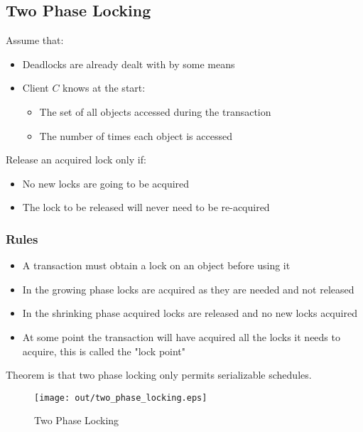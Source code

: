 \documentclass[a4paper]{article}
\begin{document}
\subsection{Two Phase Locking}

Assume that:

\begin{itemize}
  \item Deadlocks are already dealt with by some means
  \item Client $C$ knows at the start:
    \begin{itemize}
      \item The set of all objects accessed during the transaction
      \item The number of times each object is accessed
    \end{itemize}
\end{itemize}

Release an acquired lock only if:

\begin{itemize}
  \item No new locks are going to be acquired
  \item The lock to be released will never need to be re-acquired
\end{itemize}

\subsubsection{Rules}

\begin{itemize}
  \item A transaction must obtain a lock on an object before using it
  \item In the growing phase locks are acquired as they are needed and not
        released
  \item In the shrinking phase acquired locks are released and no new locks
        acquired
  \item At some point the transaction will have acquired all the locks it needs
        to acquire, this is called the "lock point"
\end{itemize}

Theorem is that two phase locking only permits serializable schedules.

\begin{figure}[h!]
  \centering
  \texttt{[image: out/two\_phase\_locking.eps]}
  \caption{Two Phase Locking}
  \label{fig:two_phase_locking}
\end{figure}
\FloatBarrier
\end{document}
